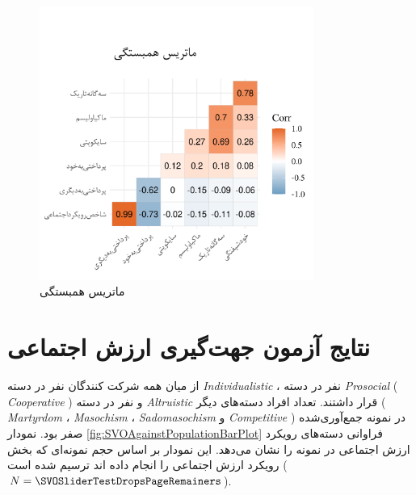 \LatexFromStatisticsRankMeansCommand
% 
\begin{figure}[htpb]
    \centering
    \includegraphics[width=0.8\textwidth]{./img/CorrPlotIntervals.png}
    \caption{ماتریس همبستگی}
    \label{fig:CorrPlotIntervals}
\end{figure}

\section{نتایج آزمون جهت‌گیری ارزش اجتماعی}
از میان همه شرکت کنندگان
\noOfIndividualisticParticipants
نفر در دسته
\textit{
    \gls{Individualistic}
}
،
\noOfCooperativeParticipants
نفر در دسته
\textit{
    \gls{Prosocial}
}\!(\textit{
    \gls{Cooperative}
})
و
\noOfAltruisticParticipants
نفر در دسته
\textit{
    \gls{Altruistic}
}
قرار داشتند.
تعداد افراد دسته‌های دیگر
\!(\!\textit{
    \gls{Martyrdom}
}،
\textit{
    \gls{Masochism}
}،
\textit{
    \gls{Sadomasochism}
} و
\textit{
    \gls{Competitive}
}\!)
در نمونه جمع‌آوری‌شده صفر بود.
نمودار \ref{fig:SVOAgainstPopulationBarPlot}
فراوانی دسته‌های رویکرد ارزش اجتماعی در نمونه را نشان می‌دهد. این نمودار بر اساس حجم نمونه‌ای که 
بخش رویکرد ارزش اجتماعی را انجام داده اند ترسیم شده است
($N=\SVOSliderTestDropsPageRemainers$).

